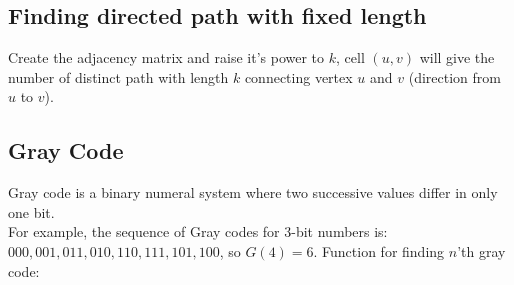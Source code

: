 \documentclass[8pt, a4paper, twocolumn]{article}
\begin{document}
\subsection{Finding directed path with fixed length}
Create the adjacency matrix and raise it's power to $k$, cell $(u,v)$ will give the number of distinct path with length $k$ connecting vertex $u$ and $v$ (direction from $u$ to $v$).

\subsection{Gray Code}
Gray code is a binary numeral system where two successive values differ in only one bit. \\For example, the sequence of Gray codes for $3$-bit numbers is: $000, 001, 011, 010, 110, 111, 101, 100$, so $G(4)=6$. Function for finding $n$'th gray code:

\end{document}
